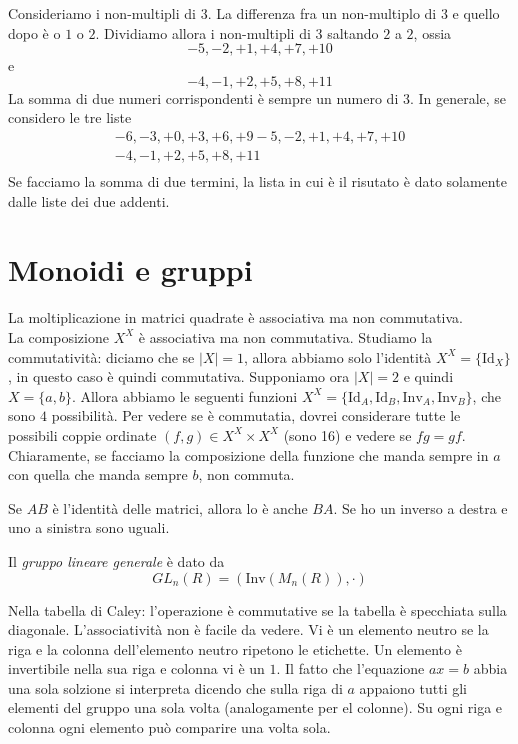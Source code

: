 \documentclass[a4paper]{article}
\begin{document}
Consideriamo i non-multipli di \(3\). La differenza fra un non-multiplo di 3 e quello dopo è 
o \(1\) o \(2\). Dividiamo allora i non-multipli di 3 saltando \(2\) a \(2\), ossia
\[
    -5, -2, +1, +4, +7, +10
\]
e
\[
    -4, -1, +2, +5, +8, +11
\]
La somma di due numeri corrispondenti è sempre un numero di 3.
In generale, se considero le tre liste
\begin{align*}
    -6, -3, +0, +3, +6, +9
    -5, -2, +1, +4, +7, +10 \\
    -4, -1, +2, +5, +8, +11 \\
\end{align*}
Se facciamo la somma di due termini, la lista in cui è il risutato è dato solamente dalle liste
dei due addenti.

\section{Monoidi e gruppi} %

La moltiplicazione in matrici quadrate è associativa ma non commutativa.
\\
La composizione \(X^X\) è associativa ma non commutativa.
Studiamo la commutatività:
diciamo che se \(|X| = 1\), allora abbiamo solo l'identità \(X^X = \{\text{Id}_X\}\),
in questo caso è quindi commutativa.
Supponiamo ora \(|X| = 2\) e quindi \(X = \{a,b\}\). Allora abbiamo le seguenti funzioni \(X^X = \{\text{Id}_A, \text{Id}_B, \text{Inv}_A, \text{Inv}_B\}\),
che sono \(4\) possibilità.
Per vedere se è commutatia, dovrei considerare
tutte le possibili coppie ordinate \((f,g) \in X^X \times X^X\)
(sono 16) e vedere se \(fg = gf\). Chiaramente, se facciamo la composizione della funzione che manda
sempre in \(a\) con quella che manda sempre \(b\), non commuta.

Se \(AB\) è l'identità delle matrici, allora lo è anche \(BA\).
Se ho un inverso a destra e uno a sinistra sono uguali.

Il \textit{gruppo lineare generale} è dato da
\[
    GL_n(R) = (\text{Inv}(M_n(R)), \cdot)
\]

Nella tabella di Caley: l'operazione è commutative se la tabella
è specchiata sulla diagonale. L'associatività non è facile da vedere.
Vi è un elemento neutro se la riga e la colonna dell'elemento neutro ripetono le etichette.
Un elemento è invertibile nella sua riga e colonna vi è un \(1\).
Il fatto che l'equazione \(ax = b\)
abbia una sola solzione si interpreta dicendo che sulla riga
di \(a\) appaiono tutti gli elementi del gruppo una sola volta
(analogamente per el colonne).
Su ogni riga e colonna ogni elemento può comparire una volta sola.
\end{document}
